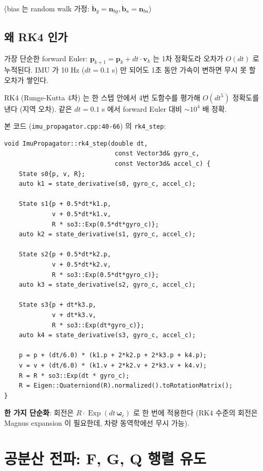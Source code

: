 \documentclass[11pt,a4paper,oneside]{report}
\DeclareMathOperator{\Exp}{Exp}
\begin{document}
(bias 는 random walk 가정: \(\dot{\bm{b}}_g = \bm{n}_{bg}, \dot{\bm{b}}_a = \bm{n}_{ba}\))

\subsection{왜 RK4 인가}

가장 단순한 forward Euler:
\(\bm{p}_{k+1} = \bm{p}_k + dt \cdot \bm{v}_k\)
는 1차 정확도라 오차가 \(O(dt)\) 로 누적된다. IMU 가 10 Hz (\(dt = 0.1\) s) 만 되어도 1초 동안 가속이 변하면 무시 못 할 오차가 쌓인다.

RK4 (Runge-Kutta 4차) 는 한 스텝 안에서 4번 도함수를 평가해 \(O(dt^5)\) 정확도를 낸다 (지역 오차). 같은 \(dt = 0.1\) s 에서 forward Euler 대비 \(\sim 10^4\) 배 정확.

본 코드 (\texttt{imu\_propagator.cpp:40-66}) 의 \texttt{rk4\_step}:

\begin{lstlisting}[style=cpp,caption={RK4 한 스텝 — \texttt{src/ekf/imu\_propagator.cpp}}]
void ImuPropagator::rk4_step(double dt,
                              const Vector3d& gyro_c,
                              const Vector3d& accel_c) {
    State s0{p, v, R};
    auto k1 = state_derivative(s0, gyro_c, accel_c);

    State s1{p + 0.5*dt*k1.p,
             v + 0.5*dt*k1.v,
             R * so3::Exp(0.5*dt*gyro_c)};
    auto k2 = state_derivative(s1, gyro_c, accel_c);

    State s2{p + 0.5*dt*k2.p,
             v + 0.5*dt*k2.v,
             R * so3::Exp(0.5*dt*gyro_c)};
    auto k3 = state_derivative(s2, gyro_c, accel_c);

    State s3{p + dt*k3.p,
             v + dt*k3.v,
             R * so3::Exp(dt*gyro_c)};
    auto k4 = state_derivative(s3, gyro_c, accel_c);

    p = p + (dt/6.0) * (k1.p + 2*k2.p + 2*k3.p + k4.p);
    v = v + (dt/6.0) * (k1.v + 2*k2.v + 2*k3.v + k4.v);
    R = R * so3::Exp(dt * gyro_c);
    R = Eigen::Quaterniond(R).normalized().toRotationMatrix();
}
\end{lstlisting}

\textbf{한 가지 단순화}: 회전은 \(R \cdot \Exp(dt \, \bm{\omega}_c)\) 로 한 번에 적용한다 (RK4 수준의 회전은 Magnus expansion 이 필요한데, 차량 동역학에선 무시 가능).

\section{공분산 전파: F, G, Q 행렬 유도}
\end{document}

